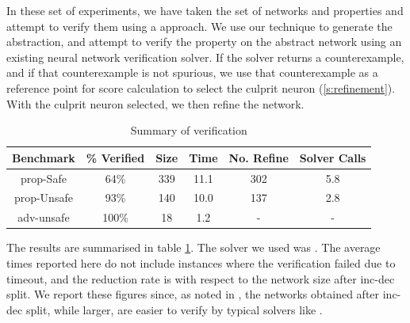 

In these set of experiments, we have taken the \acasxu set of
networks  and
properties and attempt to verify them using a \cegar approach. We use our
technique to generate the abstraction, and attempt to verify the property on the
abstract network using an existing neural network verification solver. If the
solver returns a counterexample, and if that counterexample is not spurious, we
use that counterexample as a reference point for score calculation  to select
the culprit neuron (\ref{s:refinement}). With the culprit neuron selected, we
then refine the network.

\begin{table}
\footnotesize
\begin{tabular}{ |c|c|c|c|c|c| }
\hline
Benchmark   & \% Verified & Size     & Time    & No. Refine & Solver Calls \\ 
\hline
prop-Safe   &   64\%      & 339      & 11.1    & 302        & 5.8      \\
prop-Unsafe &   93\%      & 140      & 10.0    & 137        & 2.8      \\
adv-unsafe  &  100\%      & 18       & 1.2     & -          & -        \\
\hline                                                                
\end{tabular}
\caption{Summary of \acasxu verification }
\label{t:acas-verif}
\end{table}

The results are summarised in table \ref{t:acas-verif}. The solver we used was
\abcrown. The average times reported here do not include instances where the
verification failed due to timeout, and the reduction rate is with respect to
the network size after inc-dec split. We report these figures since, as noted in
\cite{cegar-nn}, the networks obtained after inc-dec split, while larger, are
easier to verify by typical solvers like \marabou.

